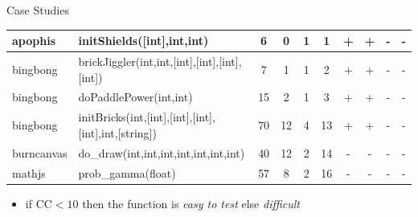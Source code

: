 \documentclass{beamer}
\begin{document}
\begin{frame}{Case Studies}
\begin{table}[!t]
\begin{tabular}{l|l|c|c|c|c|c|c|c|c}
    \hline
    apophis    & initShields([int],int,int)                                              & 6  & 0 & 1 & 1 & + & + & - & -\\
    \hline
    bingbong   & brickJiggler(int,int,[int],[int],[int],[int]) & 7  & 1  & 1 & 2  & + & + & - & - \\
    bingbong   & doPaddlePower(int,int)                            & 15 & 2  & 1 & 3  & + & + & - & - \\
    bingbong   & initBricks(int,[int],[int],[int],[int],int,[string])                         & 70 & 12 & 4 & 13 & + & + & - & - \\
    \hline
    burncanvas & do\_draw(int,int,int,int,int,int,int)                 & 40 & 12 & 2 & 14 & - & - & - & - \\
    \hline
    mathjs     & prob\_gamma(float)                                   & 57 & 8  & 2 & 16 & - & - & - & - \\
    \bottomrule
  \end{tabular}
\end{table}

\begin{itemize}
\item if $\text{CC} < 10$ then the function is \emph{easy to test} else \emph{difficult} 
\end{itemize}

\end{frame}
\end{document}
